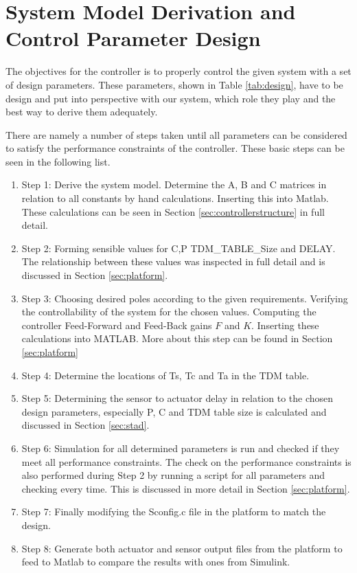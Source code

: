 \section{System Model Derivation and Control Parameter Design}
The objectives for the controller is to properly control the given system with a set of design parameters. These parameters, shown in Table \ref{tab:design}, have to be design and put into perspective with our system, which role they play and the best way to derive them adequately.

There are namely a number of steps taken until all parameters can be considered to satisfy the performance constraints of the controller. These basic steps can be seen in the following list.

\begin{enumerate}
	\item Step 1: Derive the system model. Determine the A, B and C matrices in relation to all constants by hand calculations. Inserting this into Matlab. These calculations can be seen in Section \ref{sec:controllerstructure} in full detail.
	\item Step 2: Forming sensible values for C,P TDM\_TABLE\_Size and DELAY. The relationship between these values was inspected in full detail and is discussed in Section \ref{sec:platform}.
	\item Step 3: Choosing desired poles according to the given requirements. Verifying the controllability of the system for the chosen values. Computing the controller Feed-Forward and Feed-Back gains $F$ and $K$. Inserting these calculations into MATLAB. More about this step can be found in Section \ref{sec:platform}
	\item Step 4: Determine the locations of Ts, Tc and Ta in the TDM table.
	\item Step 5: Determining the sensor to actuator delay in relation to the chosen design parameters, especially P, C and TDM table size is calculated and discussed in Section \ref{sec:stad}. 
	\item Step 6: Simulation for all determined parameters is run and checked if they meet all performance constraints. The check on the performance constraints is also performed during Step 2 by running a script for all parameters and checking every time. This is discussed in more detail in Section \ref{sec:platform}.
	\item Step 7: Finally modifying the Sconfig.c file in the platform to match the design.
	\item Step 8: Generate both actuator and sensor output files from the platform to feed to Matlab to compare the results with ones from Simulink.
\end{enumerate}


